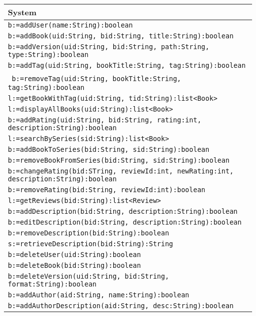 \documentclass[12pt]{article}
\begin{document}
\begin{tabular}{| l |}
    \hline
    System\\
    \hline
    \texttt{b:=addUser(name:String):boolean}\\
    \texttt{b:=addBook(uid:String, bid:String, title:String):boolean}\\
    \texttt{b:=addVersion(uid:String, bid:String, path:String, type:String):boolean}\\
    \texttt{b:=addTag(uid:String, bookTitle:String, tag:String):boolean}\\\
    \texttt{b:=removeTag(uid:String, bookTitle:String, tag:String):boolean}\\
    \texttt{l:=getBookWithTag(uid:String, tid:String):list<Book>}\\
    \texttt{l:=displayAllBooks(uid:String):list<Book>}\\
    \texttt{b:=addRating(uid:String, bid:String, rating:int, description:String):boolean}\\
    \texttt{l:=searchBySeries(sid:String):list<Book>}\\
    \texttt{b:=addBookToSeries(bid:String, sid:String):boolean}\\
    \texttt{b:=removeBookFromSeries(bid:String, sid:String):boolean}\\
    \texttt{b:=changeRating(bid:STring, reviewId:int, newRating:int, description:String):boolean}\\
    \texttt{b:=removeRating(bid:String, reviewId:int):boolean}\\
    \texttt{l:=getReviews(bid:String):list<Review>}\\
    \texttt{b:=addDescription(bid:String, description:String):boolean}\\
    \texttt{b:=editDescription(bid:String, description:String):boolean}\\
    \texttt{b:=removeDescription(bid:String):boolean}\\
    \texttt{s:=retrieveDescription(bid:String):String}\\
  \texttt{b:=deleteUser(uid:String):boolean}\\
  \texttt{b:=deleteBook(bid:String):boolean}\\
  \texttt{b:=deleteVersion(uid:String, bid:String, format:String):boolean}\\
  \texttt{b:=addAuthor(aid:String, name:String):boolean}\\
  \texttt{b:=addAuthorDescription(aid:String, desc:String):boolean}\\

\end{tabular}
\end{document}
